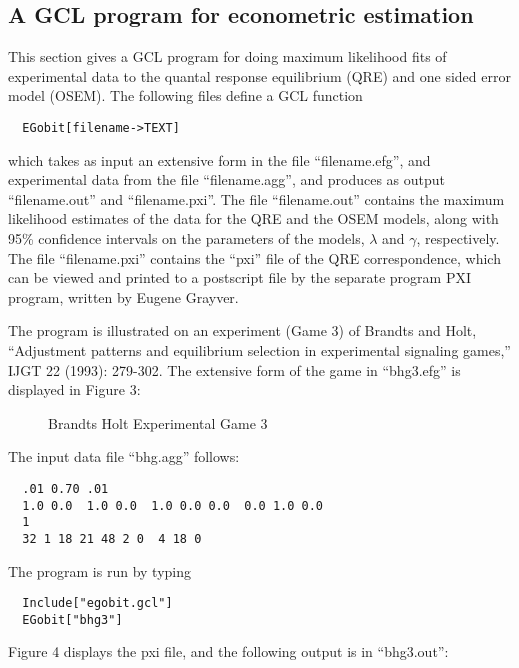 \newpage
\subsection{A GCL program for econometric estimation}  

This section gives a GCL program for doing maximum likelihood fits of
experimental data to the quantal response equilibrium (QRE) and one
sided error model (OSEM).  The following files define a GCL function 

\begin{verbatim}
  EGobit[filename->TEXT] 
\end{verbatim}

\noindent
which takes as input an extensive form in the file ``filename.efg'',
and experimental data from the file ``filename.agg'', and produces as
output ``filename.out'' and ``filename.pxi''.  The file
``filename.out'' contains the maximum likelihood estimates of the data
for the QRE and the OSEM models, along with 95\% confidence intervals
on the parameters of the models, $\lambda$ and $\gamma$, respectively.
The file ``filename.pxi'' contains the ``pxi'' file of the QRE
correspondence, which can be viewed and printed to a postscript file
by the separate program PXI program, written by Eugene Grayver.  

The program is illustrated on an experiment (Game 3) of Brandts and
Holt, ``Adjustment patterns and equilibrium selection in experimental
signaling games,'' IJGT 22 (1993): 279-302.  The extensive form of the
game in ``bhg3.efg'' is displayed in Figure 3:

\begin{figure}[htp]
\centerline{}
\caption{Brandts Holt Experimental Game 3}
\end{figure}

\noindent
The input data file ``bhg.agg'' follows:

\begin{verbatim}
  .01 0.70 .01
  1.0 0.0  1.0 0.0  1.0 0.0 0.0  0.0 1.0 0.0 
  1
  32 1 18 21 48 2 0  4 18 0
\end{verbatim}

\noindent
The program is run by typing 

\begin{verbatim}
  Include["egobit.gcl"]
  EGobit["bhg3"]
\end{verbatim}

\noindent
Figure 4 displays the pxi file, and the following output is in
``bhg3.out'':

